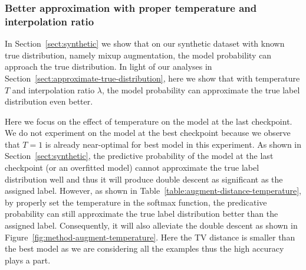 

\subsubsection{Better approximation with proper temperature and interpolation ratio}
\label{sect:better-approximate-mixup}

In Section~\ref{sect:synthetic} we show that on our synthetic dataset with known true distribution, namely mixup augmentation, the model probability can approach the true distribution. In light of our analyses in Section~\ref{sect:approximate-true-distribution}, here we show that with temperature $T$ and interpolation ratio $\lambda$, the model probability can approximate the true label distribution even better.

Here we focus on the effect of temperature on the model at the last checkpoint. We do not experiment on the model at the best checkpoint because we observe that $T=1$ is already near-optimal for best model in this experiment. As shown in Section~\ref{sect:synthetic}, the predictive probability of the model at the last checkpoint (or an overfitted model) cannot approximate the true label distribution well and thus it will produce double descent as significant as the assigned label. However, as shown in Table~\ref{table:augment-distance-temperature}, by properly set the temperature in the softmax function, the predicative probability can still approximate the true label distribution better than the assigned label. Consequently, it will also alleviate the double descent as shown in Figure~\ref{fig:method-augment-temperature}. Here the TV distance is smaller than the best model as we are considering all the examples thus the high accuracy plays a part.


